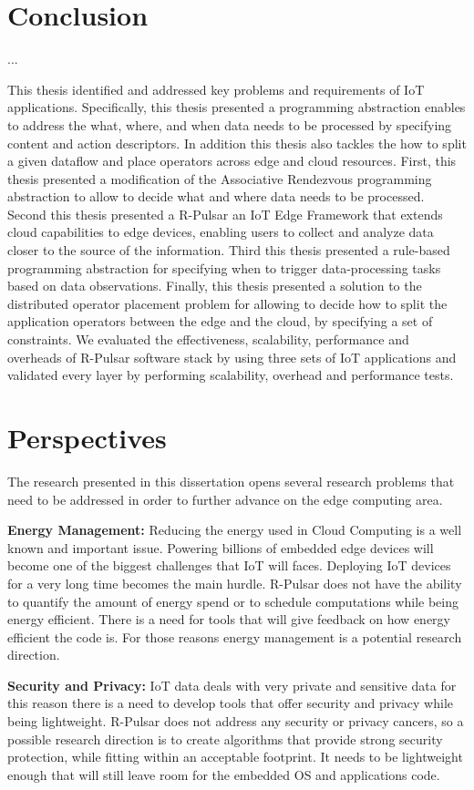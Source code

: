 \section{Conclusion}
...

This thesis identified and addressed key problems and requirements of IoT applications. Specifically, this thesis presented a programming abstraction enables to address the what, where, and when data needs to be processed by specifying content and action descriptors. In addition this thesis also tackles the how to split a given dataflow and place operators across edge and cloud resources. First, this thesis presented a modification of the Associative Rendezvous programming abstraction to allow to decide what and where data needs to be processed. Second this thesis presented a R-Pulsar an IoT Edge Framework that extends cloud capabilities to edge devices, enabling users to collect and analyze data closer to the source of the information. Third this thesis presented a rule-based programming abstraction for specifying when to trigger data-processing tasks based on data observations. Finally, this thesis presented a solution to the distributed operator placement problem for allowing to decide how to split the application operators between the edge and the cloud, by specifying a set of constraints. We evaluated the effectiveness, scalability, performance and overheads of R-Pulsar software stack by using three sets of IoT applications and validated every layer by performing scalability, overhead and performance tests.

\section{Perspectives}
The research presented in this dissertation opens several research problems that need to be addressed in order to further advance on the edge computing area.

\textbf{Energy Management:} Reducing the energy used in Cloud Computing is a well known and important issue. Powering billions of embedded edge devices will become one of the biggest challenges that IoT will faces. Deploying IoT devices for a very long time becomes the main hurdle. R-Pulsar does not have the ability to quantify the amount of energy spend or to schedule computations while being energy efficient. There is a need for tools that will give feedback on how energy efficient the code is. For those reasons energy management is a potential research direction. 

\textbf{Security and Privacy:} IoT data deals with very private and sensitive data for this reason there is a need to develop tools that offer security and privacy while being lightweight. R-Pulsar does not address any security or privacy cancers, so a possible research direction is to create algorithms that provide strong security protection, while fitting within an acceptable footprint. It needs to be lightweight enough that will still leave room for the embedded OS and applications code. 

